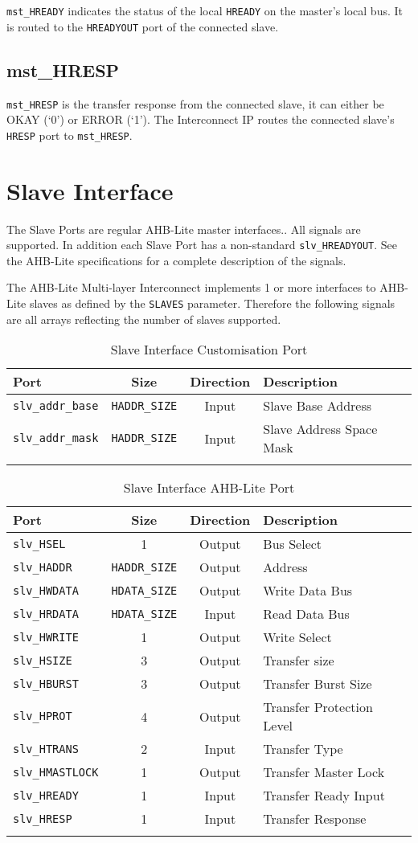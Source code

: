 \texttt{mst\_HREADY} indicates the status of the local \texttt{HREADY} on the master's
local bus. It is routed to the \texttt{HREADYOUT} port of the connected slave.

\subsection{mst\_HRESP}\label{mst_hresp}

\texttt{mst\_HRESP} is the transfer response from the connected slave, it can
either be OKAY (`0') or ERROR (`1'). The Interconnect IP routes the
connected slave's \texttt{HRESP} port to \texttt{mst\_HRESP}.

\section{Slave Interface}\label{slave-interface}

The Slave Ports are regular AHB-Lite master interfaces.. All signals are
supported. In addition each Slave Port has a non-standard
\texttt{slv\_HREADYOUT}. See the AHB-Lite specifications for a complete
description of the signals.

The AHB-Lite Multi-layer Interconnect implements 1 or more interfaces to AHB-Lite slaves
as defined by the \texttt{SLAVES} parameter. Therefore the following signals are all
arrays reflecting the number of slaves supported.

\begin{longtable}[]{@{}lccl@{}}
\toprule
Port & Size & Direction & Description\tabularnewline
\midrule
\endhead
\texttt{slv\_addr\_base} & \texttt{HADDR\_SIZE} & Input  & Slave Base Address\tabularnewline
\texttt{slv\_addr\_mask} & \texttt{HADDR\_SIZE} & Input  & Slave Address Space Mask\tabularnewline
\bottomrule
\caption{Slave Interface Customisation Port}
\end{longtable}

\begin{longtable}[]{@{}lccl@{}}
\toprule
Port & Size & Direction & Description\tabularnewline
\midrule
\endhead
\texttt{slv\_HSEL}       & 1                    & Output & Bus Select\tabularnewline
\texttt{slv\_HADDR}      & \texttt{HADDR\_SIZE} & Output & Address\tabularnewline
\texttt{slv\_HWDATA}     & \texttt{HDATA\_SIZE} & Output & Write Data Bus\tabularnewline
\texttt{slv\_HRDATA}     & \texttt{HDATA\_SIZE} & Input  & Read Data Bus\tabularnewline
\texttt{slv\_HWRITE}     & 1                    & Output & Write Select\tabularnewline
\texttt{slv\_HSIZE}      & 3                    & Output & Transfer size\tabularnewline
\texttt{slv\_HBURST}     & 3                    & Output & Transfer Burst Size\tabularnewline
\texttt{slv\_HPROT}      & 4                    & Output & Transfer Protection Level\tabularnewline
\texttt{slv\_HTRANS}     & 2                    & Input  & Transfer Type\tabularnewline
\texttt{slv\_HMASTLOCK}  & 1                    & Output & Transfer Master Lock\tabularnewline
\texttt{slv\_HREADY}     & 1                    & Input  & Transfer Ready Input\tabularnewline
\texttt{slv\_HRESP}      & 1                    & Input  & Transfer Response\tabularnewline
\bottomrule
\caption{Slave Interface AHB-Lite Port}
\end{longtable}


